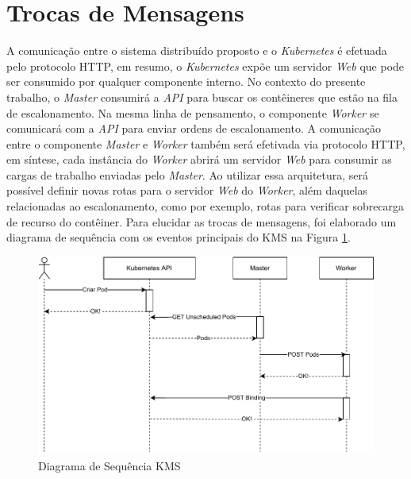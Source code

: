 \section{Trocas de Mensagens}

A comunicação entre o sistema distribuído proposto e o \textit{Kubernetes} é efetuada pelo protocolo \ac{HTTP}, em resumo, o \textit{Kubernetes} expõe um servidor \textit{Web} que pode ser consumido por qualquer componente interno. No contexto do presente trabalho, o \textit{Master} consumirá a \textit{API} para buscar os contêineres que estão na fila de escalonamento. Na mesma linha de pensamento, o componente \textit{Worker} se comunicará com a \textit{API} para enviar ordens de escalonamento. A comunicação entre o componente \textit{Master} e \textit{Worker} também será efetivada via protocolo \ac{HTTP}, em síntese, cada instância do \textit{Worker} abrirá um servidor \textit{Web} para consumir as cargas de trabalho enviadas pelo \textit{Master}. Ao utilizar essa arquitetura, será possível definir novas rotas para o servidor \textit{Web} do \textit{Worker}, além daquelas relacionadas ao escalonamento, como por exemplo, rotas para verificar sobrecarga de recurso do contêiner. Para elucidar as trocas de mensagens, foi elaborado um diagrama de sequência com os eventos principais do \ac{KMS} na Figura \ref{fig:sequencia}. 

\begin{figure}[h!]
	\caption{\label{fig:sequencia}Diagrama de Sequência \ac{KMS}}
	\centering
	\includegraphics[width=\linewidth]{assets/sequencia.pdf}
\end{figure}

